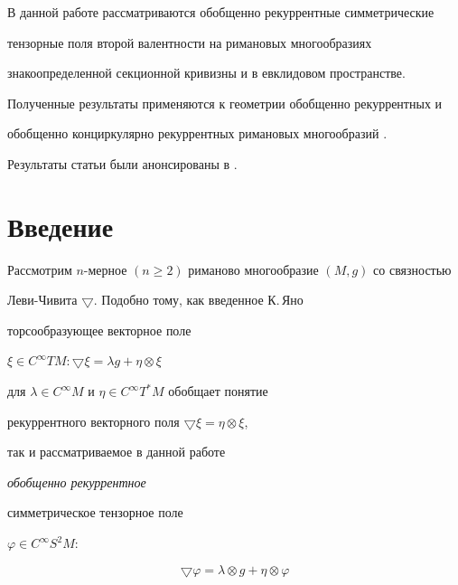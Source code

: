 \maketitle


\label{begin}











В данной работе рассматриваются обобщенно рекуррентные симметрические


тензорные поля второй валентности на римановых многообразиях


знакоопределенной секционной кривизны и в евклидовом пространстве.


Полученные результаты применяются к геометрии обобщенно рекуррентных и


обобщенно конциркулярно рекуррентных римановых многообразий \cite{tr1}.





Результаты статьи были анонсированы в \cite{tr2}.





\section{Введение}





Рассмотрим $n$-мерное $(n\ge 2)$ риманово многообразие $(M,g)$ со связностью


Леви-Чивита $\bigtriangledown$. Подобно тому, как введенное К.\,Яно \cite{tr3}


торсообразующее векторное поле


$\xi \in C^\infty T M: \bigtriangledown \xi=\lambda g+\eta \otimes \xi$


для $\lambda \in C^\infty M$ и $\eta \in C^\infty T^*M$ обобщает понятие


рекуррентного векторного поля $\bigtriangledown\xi=\eta \otimes \xi$,


так и рассматриваемое в данной работе {\it обобщенно рекуррентное


симметрическое тензорное поле} $\varphi\in C^\infty S^2 M$:


\begin{equation}


\bigtriangledown \varphi=\lambda \otimes g+\eta \otimes \varphi


\end{equation}


